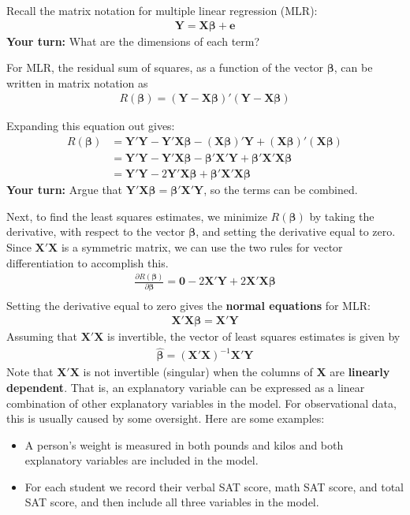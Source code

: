 \documentclass[11pt, fleqn]{article}\usepackage[]{graphicx}\usepackage[]{color}
\begin{document}
\clearpage

Recall the matrix notation for multiple linear regression (MLR):
\begin{align*}
\bm{Y} = \bm{X}\bm{\beta} + \bm{e}
\end{align*}
\textbf{Your turn:} What are the dimensions of each term?\\
\vspace{2cm}

For MLR, the residual sum of squares, as a function of the vector $\bm{\beta}$, can be written in matrix notation as 
\begin{align*}
R(\bm{\beta}) = (\bm{Y} - \bm{X} \bm{\beta})' (\bm{Y} - \bm{X} \bm{\beta})
\end{align*}

Expanding this equation out gives:
\begin{align*}
R(\bm{\beta}) &= \bm{Y'Y} - \bm{Y'X \beta} - (\bm{X\beta})' \bm{Y} + (\bm{X \beta})'(\bm{X \beta})\\
&= \bm{Y'Y} - \bm{Y'X \beta} - \bm{\beta'X'Y} + \bm{\beta' X' X \beta}\\
& = \bm{Y'Y} - 2 \bm{Y' X \beta} + \bm{\beta' X' X \beta}
\end{align*}
\textbf{Your turn:} Argue that $\bm{Y'X \beta} = \bm{\beta'X'Y}$, so the terms can be combined.\\
\vspace{3cm}

Next, to find the least squares estimates, we minimize $R(\bm{\beta})$ by taking the derivative, with respect to the vector $\bm{\beta}$, and setting the derivative equal to zero.  Since $\bm{X'X}$ is a symmetric matrix, we can use the two rules for vector differentiation to accomplish this.
\begin{align*}
\frac{\partial R(\bm{\beta})}{\partial \bm{\beta}} 
= \bm{0} - 2\bm{X'Y} + 2\bm{X'X \beta}\\
\end{align*}
Setting the derivative equal to zero gives the \textbf{normal equations} for MLR:
\begin{align*}
\bm{X'X \beta} = \bm{X'Y}
\end{align*}
Assuming that $\bm{X'X}$ is invertible, the vector of least squares estimates is given by
\begin{align*}
\bm{\hat{\beta}} = (\bm{X'X})^{-1}\bm{X'Y}
\end{align*}
\clearpage
Note that $\bm{X'X}$ is not invertible (singular) when the columns of $\bm{X}$ are \textbf{linearly dependent}.  That is, an explanatory variable can be expressed as a linear combination of other explanatory variables in the model.  For observational data, this is usually caused by some oversight.  Here are some examples: 
\begin{itemize}
\item A person's weight is measured in both pounds and kilos and both explanatory variables are included in the model.
\item For each student we record their verbal SAT score, math SAT score, and total SAT score, and then include all three variables in the model.  
\end{itemize}
\end{document}
